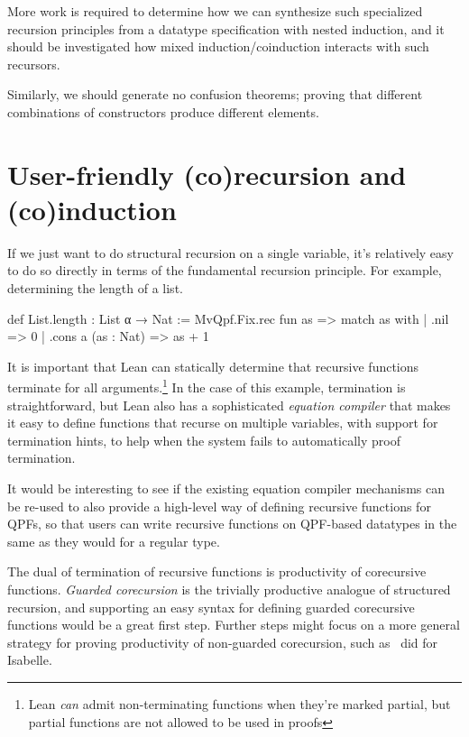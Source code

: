 More work is required to determine how we can synthesize such specialized recursion principles from
a datatype specification with nested induction, and it should be investigated how mixed induction/coinduction
interacts with such recursors.

Similarly, we should generate no confusion theorems; proving that different combinations of constructors
produce different elements.




\section{User-friendly (co)recursion and (co)induction}
If we just want to do structural recursion on a single variable, it's relatively easy to do so directly
in terms of the fundamental recursion principle.
For example, determining the length of a list.
\begin{leancode}
def List.length : List α → Nat :=
  MvQpf.Fix.rec fun as => match as with
    | .nil                => 0
    | .cons a (as : Nat)  => as + 1 
\end{leancode}

It is important that Lean can statically determine that recursive functions terminate for all 
arguments.\footnote{Lean \emph{can} admit non-terminating functions when they're marked partial, but partial functions are not allowed to be used in proofs}
In the case of this example, termination is straightforward,
but Lean also has a sophisticated \emph{equation compiler} that makes it easy to define functions that recurse
on multiple variables, with support for termination hints, to help when the system fails to automatically proof
termination.

It would be interesting to see if the existing equation compiler mechanisms can be re-used
to also provide a high-level way of defining recursive functions for QPFs, so that users can write
recursive functions on QPF-based datatypes in the same as they would for a regular \inductive{} type.

The dual of termination of recursive functions is productivity of corecursive functions.
\emph{Guarded corecursion} is the trivially productive analogue of structured recursion, 
and supporting an easy syntax for defining guarded corecursive functions would be a great first step.
Further steps might focus on a more general strategy for proving productivity of non-guarded corecursion,
such as~\cite{blanchetteFriendsBenefitsImplementing2017} did for Isabelle.

